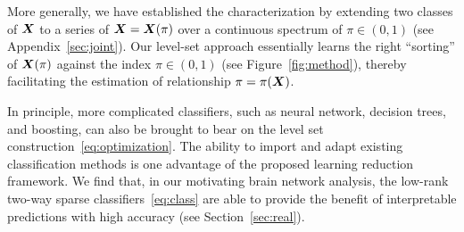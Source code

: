 \documentclass[11pt]{article}
\theoremstyle{plain}
\theoremstyle{definition}
\newtheorem{prop}{Proposition}
\def\sign{\textup{sign}}
\begin{document}
More generally, we have established the characterization by extending two classes of $\bm X$ to a series of $\bm X=\bm X(\pi)$ over a continuous spectrum of $\pi \in (0,1)$ (see Appendix~\ref{sec:joint}). Our level-set approach essentially learns the right ``sorting'' of $\bm X(\pi)$ against the index $\pi\in(0,1)$ (see Figure~\ref{fig:method}), thereby facilitating the estimation of relationship $\pi=\pi(\bm X)$. 




In principle, more complicated classifiers, such as neural network, decision trees, and boosting, can also be brought to bear on the level set construction~\eqref{eq:optimization}. The ability to import and adapt existing classification methods is one advantage of the proposed learning reduction framework. We find that, in our motivating brain network analysis, the low-rank two-way sparse classifiers~\eqref{eq:class} are able to provide the benefit of interpretable predictions with high accuracy (see Section~\ref{sec:real}). 
\end{document}
